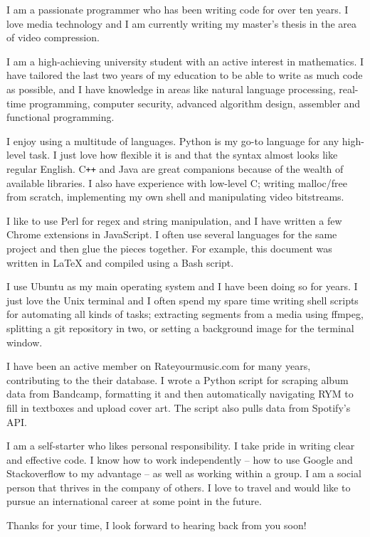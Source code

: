 I am a passionate programmer who has been writing code for over ten years. I love media technology and I am currently writing my master's thesis in the area of video compression.

I am a high-achieving university student with an active interest in mathematics. I have tailored the last two years of my education to be able to write as much code as possible, and I have knowledge in areas like natural language processing, real-time programming, computer security, advanced algorithm design, assembler and functional programming.

I enjoy using a multitude of languages. Python is my go-to language for any high-level task. I just love how flexible it is and that the syntax almost looks like regular English. C\texttt{++} and Java are great companions because of the wealth of available libraries. I also have experience with low-level C; writing malloc/free from scratch, implementing my own shell and manipulating video bitstreams.

I like to use Perl for regex and string manipulation, and I have written a few Chrome extensions in JavaScript. I often use several languages for the same project and then glue the pieces together. For example, this document was written in LaTeX and compiled using a Bash script.

I use Ubuntu as my main operating system and I have been doing so for years. I just love the Unix terminal and I often spend my spare time writing shell scripts for automating all kinds of tasks; extracting segments from a media using ffmpeg, splitting a git repository in two, or setting a background image for the terminal window.

I have been an active member on Rateyourmusic.com for many years, contributing to the their database. I wrote a Python script for scraping album data from Bandcamp, formatting it and then automatically navigating RYM to fill in textboxes and upload cover art. The script also pulls data from Spotify's API.

I am a self-starter who likes personal responsibility. I take pride in writing clear and effective code. I know how to work independently – how to use Google and Stackoverflow to my advantage – as well as working within a group. I am a social person that thrives in the company of others. I love to travel and would like to pursue an international career at some point in the future.

Thanks for your time, I look forward to hearing back from you soon!